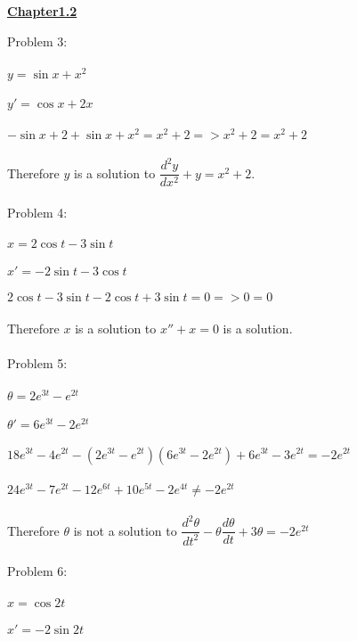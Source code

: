 \documentclass[12pt]{exam}
\begin{document}
\begin{center}\Large{\textbf{\underline{Chapter1.2}}}\end{center}
Problem 3:\\\\$y=\sin{x}+x^2$ \\\\
$y'=\cos{x}+2x$ \\\\
$-\sin{x}+2+\sin{x}+x^2=x^2+2 => x^2+2=x^2+2$\\\\
Therefore $y$ is a solution to $\dfrac{d^2y}{dx^2}+y=x^2+2$.\\\\
Problem 4:\\\\$x=2\cos{t}-3\sin{t}$ \\\\
$x'=-2\sin{t}-3\cos{t}$ \\\\
$2\cos{t}-3\sin{t}-2\cos{t}+3\sin{t}=0 =>0=0 $\\\\
Therefore $x$ is a solution to $x''+x=0$ is a solution.\\\\
Problem 5:\\\\$\theta=2e^{3t}-e^{2t}$ \\\\
$\theta'=6e^{3t}-2e^{2t}$ \\\\
$18e^{3t}-4e^{2t}-(2e^{3t}-e^{2t})(6e^{3t}-2e^{2t})+6e^{3t}-3e^{2t}=-2e^{2t}$\\\\
$24e^{3t}-7e^{2t}-12e^{6t}+10e^{5t}-2e^{4t}\neq-2e^{2t}$\\\\
Therefore $\theta$ is  not a solution to $\dfrac{d^2\theta}{dt^2}-\theta\dfrac{d\theta}{dt}+3\theta=-2e^{2t}$\\\\
Problem 6:\\\\$x=\cos{2t}$ \\\\
$x'=-2\sin{2t}$\\\\
\end{document}
